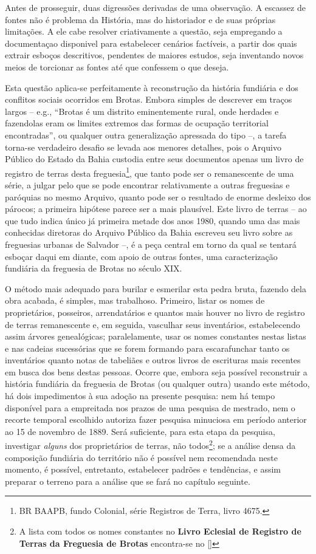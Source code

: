 Antes de prosseguir, duas digressões derivadas de uma observação. A escassez de fontes não é problema da História, mas do historiador e de suas próprias limitações. A ele cabe resolver criativamente a questão, seja empregando a documentaçao disponivel para estabelecer cenários factíveis, a partir dos quais extrair esboços descritivos, pendentes de maiores estudos, seja inventando novos meios de torcionar as fontes até que confessem o que deseja.

Esta questão aplica-se perfeitamente à reconstrução da história fundiária e dos conflitos sociais ocorridos em Brotas. Embora simples de descrever em traços largos -- e.g., ``Brotas é um distrito eminentemente rural, onde herdades e fazendolas eram os limites extremos das formas de ocupação territorial encontradas'', ou qualquer outra generalização apressada do tipo --, a tarefa torna-se verdadeiro desafio se levada aos menores detalhes, pois o Arquivo Público do Estado da Bahia custodia entre seus documentos apenas um livro de registro de terras desta freguesia\footnote{BR BAAPB, fundo Colonial, série Registros de Terra, livro 4675.}, que tanto pode ser o remanescente de uma série, a julgar pelo que se pode encontrar relativamente a outras freguesias e paróquias no mesmo Arquivo, quanto pode ser o resultado de enorme desleixo dos párocos; a primeira hipótese parece ser a mais plausível. Este livro de terras -- ao que tudo indica único já primeira metade dos anos 1980, quando uma das mais conhecidas diretoras do Arquivo Público da Bahia escreveu seu livro sobre as freguesias urbanas de Salvador \cite{NASCIMENTO2007} --, é a peça central em torno da qual se tentará esboçar daqui em diante, com apoio de outras fontes, uma caracterização fundiária da freguesia de Brotas no século XIX. 

O método mais adequado para burilar e esmerilar esta pedra bruta, fazendo dela obra acabada, é simples, mas trabalhoso. Primeiro, listar os nomes de proprietários, posseiros, arrendatários e quantos mais houver no livro de registro de terras remanescente e, em seguida, vasculhar seus inventários, estabelecendo assim árvores genealógicas; paralelamente, usar os nomes constantes nestas listas e nas cadeias sucessórias que se forem formando para escarafunchar tanto os inventários quanto notas de tabeliães e outros livros de escrituras mais recentes em busca dos bens destas pessoas. Ocorre que, embora seja possível reconstruir a história fundiária da freguesia de Brotas (ou qualquer outra) usando este método, há dois impedimentos à sua adoção na presente pesquisa: nem há tempo disponível para a empreitada nos prazos de uma pesquisa de mestrado, nem o recorte temporal escolhido autoriza fazer pesquisa minuciosa em período anterior ao 15 de novembro de 1889. Será suficiente, para esta etapa da pesquisa, investigar \textit{alguns} dos proprietários de terras, não todos\footnote{A lista com todos os nomes constantes no \textbf{Livro Eclesial de Registro de Terras da Freguesia de Brotas} encontra-se no \autoref{}}; se a análise densa da composição fundiária do território não é possível nem recomendada neste momento, é possível, entretanto, estabelecer padrões e tendências, e assim preparar o terreno para a análise que se fará no capítulo seguinte.

